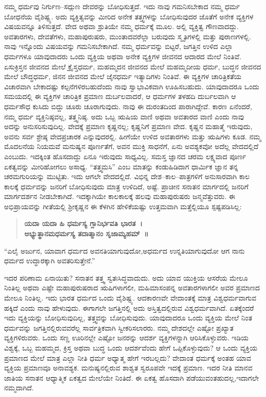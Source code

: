ನಮ್ಮ ಧರ್ಮವು ನಿರ್ಗುಣ–ಸದ್ಗುಣ ದೇವರನ್ನು ಬೋಧಿಸುತ್ತದೆ. ಇದು ನಾವು ಗಮನಿಸಬೇಕಾದ ನಮ್ಮ ಧರ್ಮ ಬೋಧನೆಯ ವೈಶಿಷ್ಟ್ಯ. ಅದು ವ್ಯಕ್ತಿತ್ವವನ್ನು ಮೀರಿದ ಅನೇಕ ತತ್ತ್ವಗಳನ್ನು ಬೋಧಿಸುವುದರ ಜೊತೆಗೆ ಅನೇಕ ವ್ಯಕ್ತಿಗಳ ವಿಷಯವನ್ನೂ ತಿಳಿಸುತ್ತದೆ. ವೇದ ಅಥವಾ ಶ್ರುತಿಯೇ ನಮ್ಮ ಧರ್ಮಕ್ಕೆ ಮೂಲ. ಅಲ್ಲಿ ವ್ಯಕ್ತಿತ್ವ ಗೌಣವಾದದ್ದು. ಅವತಾರಗಳು, ದೇವತೆಗಳು, ಮಹಾಪುರುಷರು, ಮುಂತಾದವರೆಲ್ಲಾ ಬರುವುದು ಸ್ಮೃತಿಗಳಲ್ಲಿ ಮತ್ತು ಪುರಾಣಗಳಲ್ಲಿ. ನಾವು ಇನ್ನೊಂದು ವಿಷಯವನ್ನು ಗಮನಿಸಬೇಕಾಗಿದೆ. ನಮ್ಮ ಧರ್ಮವನ್ನು ಬಿಟ್ಟರೆ, ಜಗತ್ತಿನ ಉಳಿದ ಎಲ್ಲಾ ಧರ್ಮಗಳೂ ಯಾವುದಾದರು ಒಂದು ವ್ಯಕ್ತಿಯ ಅಥವಾ ಅನೇಕ ವ್ಯಕ್ತಿಗಳ ಜೀವನದ ಆದಾರದ ಮೇಲೆ ನಿಂತಿವೆ. ಏಸುಕ್ರಿಸ್ತನ ಜೀವನದ ಮೇಲೆ ಕ್ರೈಸ್ತಧರ್ಮ, ಮಹಮ್ಮದನ ಜೀವನದ ಮೇಲೆ ಮಹಮ್ಮದೀಯ ಧರ್ಮ, ಬುದ್ಧನ ಜೀವನದ ಮೇಲೆ ಬೌದ್ಧಧರ್ಮ, ಜಿನನ ಜೀವನದ ಮೇಲೆ ಜೈನಧರ್ಮ ಇತ್ಯಾದಿಗಳು ನಿಂತಿವೆ. ಈ ವ್ಯಕ್ತಿಗಳ ಚಾರಿತ್ರಿಕತೆಯ ವಿಚಾರವಾಗಿ ಬೇಕಾದಷ್ಟು ಕಲ್ಪನೆಗಳಿರಬಹುದೆಂದು ನಾವು ಸ್ವಾಭಾವಿಕವಾಗಿ ಊಹಿಸಬಹುದು. ಯಾವುದಾದರೂ ಒಂದು ಸಮಯದಲ್ಲಿ ಈ ವ್ಯಕ್ತಿಗಳ ಚಾರಿತ್ರಿಕ ಪ್ರಮಾಣ ದುರ್ಬಲವಾದರೆ, ಆ ಧರ್ಮಗಳ ತಳಹದಿ ದುರ್ಬಲವಾಗಿ ಆ ಧರ್ಮಸೌಧ ಕುಸಿದು ಬಿದ್ದು ಚೂರು ಚೂರಾಗುವುದು. ನಾವು ಈ ದುರಂತದಿಂದ ಪಾರಾಗಿದ್ದೇವೆ. ಕಾರಣ ಏನೆಂದರೆ, ನಮ್ಮ ಧರ್ಮ ವ್ಯಕ್ತಿನಿಷ್ಠವಲ್ಲ, ತತ್ತ್ವನಿಷ್ಠ. ಅದು ಒಬ್ಬ ಋಷಿಯ ವಾಣಿ ಅಥವಾ ಅವತಾರದ ವಾಣಿ ಎಂದು ನಾವು ಅದನ್ನು ಅನುಸರಿಸುವುದಿಲ್ಲ. ವೇದಕ್ಕೆ ಪ್ರಮಾಣ ಕೃಷ್ಣನಲ್ಲ; ಕೃಷ್ಣನಿಗೆ ಪ್ರಮಾಣ ವೇದ. ಕೃಷ್ಣನ ಮಹಾತ್ಮೆ ಇರುವುದು, ಅವನು ಸರ್ವ ಶ್ರೇಷ್ಠ ವೇದಪ್ರಚಾರಕ ಎನ್ನುವುದರಲ್ಲಿ. ಹೀಗೆಯೇ ಉಳಿದ ಅವತಾರಗಳು ಮತ್ತು ಋಷಿಗಳು ಕೂಡ. ನಮ್ಮ ಮೊದಲನೆಯ ನಿಯಮವೆ ಮನುಷ್ಯನ ಪೂರ್ಣತೆಗೆ, ಅವನ ಮುಕ್ತಿ ಸಾಧನೆಗೆ, ಏನು ಅವಶ್ಯಕವೋ ಅದೆಲ್ಲ ವೇದದಲ್ಲಿದೆ ಎಂಬುದು. ಇದಕ್ಕಿಂತ ಹೊಸದಾದ್ದು ಏನೂ ಇರುವುದು ಸಾಧ್ಯವಿಲ್ಲ. ಸಮಸ್ತ ಜ್ಞಾನದ ಚರಮ ಲಕ್ಷ್ಯವಾದ ಪೂರ್ಣ ಏಕತ್ವವನ್ನು ಮೀರಿಹೋಗಲು ಅಸಾಧ್ಯ. “ತತ್ತ್ವಮಸಿ” ಎಂಬ ಮಾತನ್ನು ಕಂಡುಹಿಡಿದಾಗ ಧಾರ್ಮಿಕ ಜ್ಞಾನ ತನ್ನ ಚರಮಗುರಿಯನ್ನು ಮುಟ್ಟಿತು. ಇದು ಆಗಲೇ ವೇದದಲ್ಲಿದೆ. ವಿಭಿನ್ನ ದೇಶ–ಕಾಲ–ಪಾತ್ರಗಳಿಗೆ ಅನುಸಾರವಾಗಿ ಕಾಲ ಕಾಲಕ್ಕೆ ಧರ್ಮವನ್ನು ಜನರಿಗೆ ಬೋಧಿಸುವುದು ಮಾತ್ರ ಉಳಿದಿದೆ, ಅಷ್ಟೆ. ಪ್ರಾಚೀನ ಸನಾತನ ಮಾರ್ಗದಲ್ಲಿ ಜನರಿಗೆ ಮಾರ್ಗದರ್ಶನ ನೀಡಬೇಕಾಗಿದೆ. ಇದಕ್ಕಾಗಿಯೇ ಕಾಲಕಾಲಕ್ಕೆ ಹಲವು ಮಹಾಪುರುಷರು ಜನ್ಮವೆತ್ತುವರು. ಈ ಅಭಿಪ್ರಾಯವನ್ನು ಗೀತೆಯಲ್ಲಿ ಶ‍್ರೀಕೃಷ್ಣನ ಈ ಕೆಳಗಿನ ಹೇಳಿಕೆಯಷ್ಟು ಉತ್ತಮವಾಗಿ ಮತ್ತೆಲ್ಲಿಯೂ ಸ್ಪಷ್ಟಪಡಿಸಿಲ್ಲ:

\begin{verse}
\textbf{ಯದಾ ಯದಾ ಹಿ ಧರ್ಮಸ್ಯ ಗ್ಲಾನಿರ್ಭವತಿ ಭಾರತ~।}\\\textbf{ಅಭ್ಯುತ್ಥಾನಮಧರ್ಮಸ್ಯ ತದಾತ್ಮಾನಂ ಸೃಜಾಮ್ಯಹಮ್​~॥}
\end{verse}

“ಎಲೈ ಅರ್ಜುನ, ಯಾವಾಗ ಧರ್ಮದ ಅವನತಿಯಾಗುವುದೋ,\break ಅಧರ್ಮದ ಉನ್ನತಿಯಾಗುವುದೋ ಆಗ ನಾನು ಧರ್ಮದ ಉದ್ಧಾರಕ್ಕಾಗಿ ಅವತರಿಸುತ್ತೇನೆ.”

ಇದರ ಪರಿಣಾಮ ಏನಾಯಿತು? ಸನಾತನ ತತ್ತ್ವ ಸ್ವತಃಸಿದ್ಧವಾದುದು. ಅದು ಯಾವ ಯುಕ್ತಿಯ ಆಸರೆಯ ಮೇಲೂ ನಿಂತಿಲ್ಲ ಅಥವಾ ಎಷ್ಟೇ ಮಹಾಪುರುಷರಾದ ಋಷಿಗಳಾಗಲೀ, ಮಹಿಮಾಸಂಪನ್ನ ಅವತಾರಗಳಾಗಲೀ ಅವರ ಪ್ರಮಾಣದ ಮೇಲೂ ನಿಂತಿಲ್ಲ. ಇದು ಭಾರತ ಧರ್ಮದ ಒಂದು ವೈಶಿಷ್ಟ್ಯ. ಆದಕಾರಣವೇ ವೇದಾಂತಕ್ಕೆ ಮಾತ್ರ ವಿಶ್ವಧರ್ಮವಾಗುವ ಹಕ್ಕಿದೆ ಎಂದು ನಾವು ಹೇಳುವುದು. ಈಗಾಗಲೇ ಜಗತ್ತಿನಲ್ಲಿ ಅದು ಅಸ್ತಿತ್ವದಲ್ಲಿರುವ ವಿಶ್ವಧರ್ಮವಾಗಿದೆ. ಏತಕ್ಕೆಂದರೆ ಇದು ವ್ಯಕ್ತಿಯನ್ನು ಬೋಧಿಸುವುದಿಲ್ಲ, ತತ್ತ್ವವನ್ನು ಬೋಧಿಸುವುದು. ಯಾವುದಾದರೂ ಒಂದು ವ್ಯಕ್ತಿಯ ಮೇಲೆ ನಿಂತ ಧರ್ಮವನ್ನು ಜಗತ್ತಿನಲ್ಲಿರುವವರೆಲ್ಲ ಸಾರ್ವತ್ರಿಕವಾಗಿ ಸ್ವೀಕರಿಸಲಾರರು. ನಮ್ಮ ದೇಶದಲ್ಲೇ ಎಷ್ಟೋ ಪ್ರಖ್ಯಾತ ವ್ಯಕ್ತಿಗಳಿರುವರು. ಒಂದು ಸಣ್ಣ ಊರಿನಲ್ಲೇ ಎಷ್ಟೋ ಜನರನ್ನು ಆದರ್ಶ ವ್ಯಕ್ತಿಗಳನ್ನಾಗಿ ಆರಿಸಿಕೊಳ್ಳುವರು. ಇಡಿಯ ವಿಶ್ವಕ್ಕೆ, ಒಬ್ಬ ಮಹಮ್ಮದ, ಕ್ರಿಸ್ತ ಅಥವಾ ಬುದ್ಧ ಒಂದು ಆದರ್ಶವೆಂದು ಹೇಗೆ ಒಪ್ಪಿಕೊಳ್ಳುವುದು? ಆ ಒಂದು ವ್ಯಕ್ತಿಯ ಪ್ರಮಾಣದ ಮೇಲೆ ಮಾತ್ರ ಎಲ್ಲಾ ನೀತಿ ಧರ್ಮ ಅಧ್ಯಾತ್ಮ ಹೇಗೆ ಇರಬಲ್ಲದು? ವೇದಾಂತ ಧರ್ಮಕ್ಕೆ ಅಂತಹ ಯಾವ ವ್ಯಕ್ತಿಯ ಪ್ರಮಾಣವೂ ಅನಾವಶ್ಯಕ. ಮನುಷ್ಯನಲ್ಲಿರುವ ಶಾಶ್ವತ ಸ್ವರೂಪವೇ ಇದಕ್ಕೆ ಪ್ರಮಾಣ. ಇದರ ನೀತಿ ಮಾನವ ಜಾತಿಯ ಸನಾತನ ಆಧ್ಯಾತ್ಮಿಕ ಏಕತ್ವದ ಮೇಲೆಯೇ ನಿಂತಿದೆ. ಈ ಏಕತ್ವ ಹೊಸದಾಗಿ ಪಡೆಯುವಂತಹುದಲ್ಲ,\break ಇದಾಗಲೇ ನಮ್ಮದಾಗಿದೆ.

